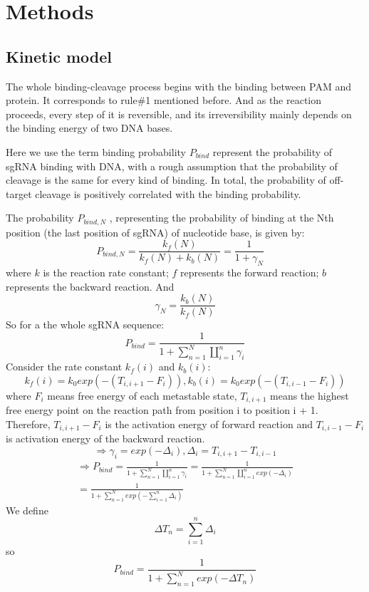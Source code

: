 \section{Methods}
\subsection{Kinetic model}
The whole binding-cleavage process begins with the binding between PAM and protein. It corresponds to rule\#1 mentioned before. And as the reaction proceeds, every step of it is reversible, and its irreversibility mainly depends on the binding energy of two DNA bases.
	
Here we use the term binding probability $P_{bind}$ represent the probability of sgRNA binding with DNA, with a rough assumption that the probability of cleavage is the same for every kind of binding. In total, the probability of off-target cleavage is positively correlated with the binding probability. 

The probability $P_{bind,N}$ , representing the probability of binding at the Nth position (the last position of sgRNA) of nucleotide base, is given by:
\begin{equation}
P_{bind,N}=\frac{k_f(N)}{k_f(N)+k_b(N)}=\frac{1}{1+\gamma_N} \quad
\end{equation}
where $k$ is the reaction rate constant; $f$ represents the forward reaction; $b$ represents the backward reaction. And 
\begin{equation}
 \gamma_N=\frac{k_b(N)}{k_f(N)}
\end{equation}
So for a the whole sgRNA sequence: 
\begin{equation}
P_{bind} = \frac{1}{1+\sum_{n=1}^N\coprod_{i=1}^n \gamma_i}
\end{equation}
Consider the rate constant $k_f(i)$ and $k_b(i)$:
\begin{equation}
k_f(i)=k_0exp(-(T_{i,i+1}-F_i)),k_b(i)=k_0exp(-(T_{i,i-1}-F_i))
\end{equation}
where $F_i$ means free energy of each metastable state, $T_{i,i+1}$ means the highest free energy point on the reaction path from position i to position i + 1. Therefore, $T_{i,i+1}-F_i$ is the activation energy of forward reaction and $T_{i,i-1}-F_i$ is activation energy of the backward reaction.
\begin{equation}
\Rightarrow \gamma_i=exp(-\Delta_i), \Delta_i=T_{i,i+1}-T_{i,i-1}
\end{equation}
\begin{equation}
\begin{aligned}
\Rightarrow P_{bind} = \frac{1}{1+\sum_{n=1}^N\coprod_{i=1}^n \gamma_i}=\frac{1}{1+\sum_{n=1}^N\coprod_{i=1}^n exp(-\Delta_i)}\\=\frac{1}{1+\sum_{n=1}^N exp(-\sum_{i=1}^n\Delta_i)}
\end{aligned}
\end{equation}
We define $$\Delta T_n=\sum_{i=1}^n\Delta_i$$
so
\begin{equation} 
P_{bind} =\frac{1}{1+\sum_{n=1}^N exp(-\Delta T_n)}
\end{equation}
	
